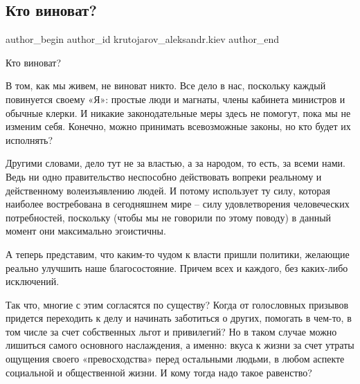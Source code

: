  
 
 
 
 
 
\subsection{Кто виноват?}
\label{sec:18_01_2021.fb.krutojarov_aleksandr.kiev.1.kto_vinovat}
 
\ifcmt
 author_begin
   author_id krutojarov_aleksandr.kiev
 author_end
\fi

Кто виноват?

В том, как мы живем, не виноват никто. Все дело в нас, поскольку каждый
повинуется своему «Я»: простые люди и магнаты, члены кабинета министров и
обычные клерки. И никакие законодательные меры здесь не помогут, пока мы не
изменим себя. Конечно, можно принимать всевозможные законы, но кто будет их
исполнять?

Другими словами, дело тут не за властью, а за народом, то есть, за всеми нами.
Ведь ни одно правительство неспособно действовать вопреки реальному и
действенному волеизъявлению людей. И потому использует ту силу, которая
наиболее востребована в сегодняшнем мире – силу удовлетворения человеческих
потребностей, поскольку (чтобы мы не говорили по этому поводу) в данный момент
они максимально эгоистичны.

А теперь представим, что каким-то чудом к власти пришли политики, желающие
реально улучшить наше благосостояние. Причем всех и каждого, без каких-либо
исключений.

Так что, многие с этим согласятся по существу? Когда от голословных призывов
придется переходить к делу и начинать заботиться о других, помогать в чем-то, в
том числе за счет собственных льгот и привилегий? Но в таком случае можно
лишиться самого основного наслаждения, а именно: вкуса к жизни за счет утраты
ощущения своего «превосходства» перед остальными людьми, в любом аспекте
социальной и общественной жизни. И кому тогда надо такое равенство?

